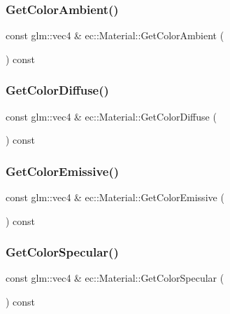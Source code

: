 \subsubsection{\texorpdfstring{Get\+Color\+Ambient()}{GetColorAmbient()}}
{\footnotesize\ttfamily const glm\+::vec4 \& ec\+::\+Material\+::\+Get\+Color\+Ambient (\begin{DoxyParamCaption}{ }\end{DoxyParamCaption}) const}

\mbox{\label{classec_1_1_material_afe0745114f9fa1cae980396685669073}} 
\subsubsection{\texorpdfstring{Get\+Color\+Diffuse()}{GetColorDiffuse()}}
{\footnotesize\ttfamily const glm\+::vec4 \& ec\+::\+Material\+::\+Get\+Color\+Diffuse (\begin{DoxyParamCaption}{ }\end{DoxyParamCaption}) const}

\mbox{\label{classec_1_1_material_a01f33ac7f9bdeb7b8c2a7a44f4902c4e}} 
\subsubsection{\texorpdfstring{Get\+Color\+Emissive()}{GetColorEmissive()}}
{\footnotesize\ttfamily const glm\+::vec4 \& ec\+::\+Material\+::\+Get\+Color\+Emissive (\begin{DoxyParamCaption}{ }\end{DoxyParamCaption}) const}

\mbox{\label{classec_1_1_material_aab38aa7a5689a647fe10287c6b97d54d}} 
\subsubsection{\texorpdfstring{Get\+Color\+Specular()}{GetColorSpecular()}}
{\footnotesize\ttfamily const glm\+::vec4 \& ec\+::\+Material\+::\+Get\+Color\+Specular (\begin{DoxyParamCaption}{ }\end{DoxyParamCaption}) const}

